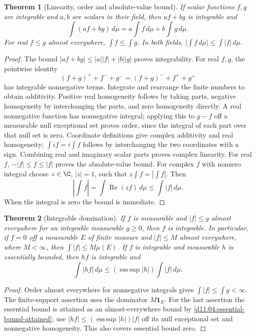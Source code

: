 \documentclass[11pt,oneside,openany]{book}
\newtheorem{theorem}{Theorem}[chapter]
\theoremstyle{definition}
\theoremstyle{remark}
\newcommand{\one}{\mathbf1}\newcommand{\ind}[1]{\mathbf1_{#1}}
\DeclareMathOperator{\esssup}{ess\,sup}\DeclareMathOperator{\Var}{Var}
\newcommand{\family}[1]{}
\begin{document}
\begin{theorem}[Linearity, order and absolute-value bound]
\family{D11.06.linearity_order_norm}\label{d11:06:linearity-order-norm}
If scalar functions $f,g$ are integrable and $a,b$ are scalars in their
field, then $af+bg$ is integrable and
\[
 \int(af+bg)\,d\mu=a\int f\,d\mu+b\int g\,d\mu.
\]
For real $f\leq g$ almost everywhere, $\int f\leq\int g$. In both fields,
$\big|\int f\,d\mu\big|\leq\int|f|\,d\mu$.
\end{theorem}
\begin{proof}
The bound $|af+bg|\leq|a||f|+|b||g|$ proves integrability. For real
$f,g$, the pointwise identity
\[
 (f+g)^++f^-+g^-=(f+g)^-+f^++g^+
\]
has integrable nonnegative terms. Integrate and rearrange the finite
numbers to obtain additivity. Positive real homogeneity follows by taking
parts, negative homogeneity by interchanging the parts, and zero
homogeneity directly. A real nonnegative function has nonnegative integral;
applying this to $g-f$ off a measurable null exceptional set proves order,
since the integral of each part over that null set is zero.
Coordinate definitions give complex additivity and real homogeneity;
$\int if=i\int f$ follows by interchanging the two coordinates with a
sign. Combining real and imaginary scalar parts proves complex linearity.
For real $f$, $-|f|\leq f\leq|f|$ proves the absolute-value bound.
For complex $f$ with nonzero integral choose $z\in\C$, $|z|=1$, such that
$z\int f=|\int f|$. Then
\[
 \left|\int f\right|=\int\operatorname{Re}(zf)\,d\mu
 \leq\int|f|\,d\mu.
\]
When the integral is zero the bound is immediate.
\end{proof}

\begin{theorem}[Integrable domination]
\family{D11.06.integrable_domination}\label{d11:06:integrable-domination}
If $f$ is measurable and $|f|\leq g$ almost everywhere for an integrable
measurable $g\geq0$, then $f$ is integrable. In particular, if $f=0$ off
a measurable $E$ of finite measure and $|f|\leq M$ almost everywhere,
where $M<\infty$, then $\int|f|\leq M\mu(E)$.
If $f$ is integrable and measurable $h$ is essentially bounded, then
$hf$ is integrable and
\[
 \int|hf|\,d\mu\leq(\esssup|h|)\int|f|\,d\mu.
\]
\end{theorem}
\begin{proof}
Order almost everywhere for nonnegative integrals gives
$\int|f|\leq\int g<\infty$. The finite-support assertion uses the
dominator $M\one_E$. For the last assertion the essential bound is attained
as an almost-everywhere bound by \cref{d11:04:essential-bound-attained};
use $|hf|\leq(\esssup|h|)|f|$ off its null exceptional set and nonnegative
homogeneity. This also covers essential bound zero.
\end{proof}
\end{document}
